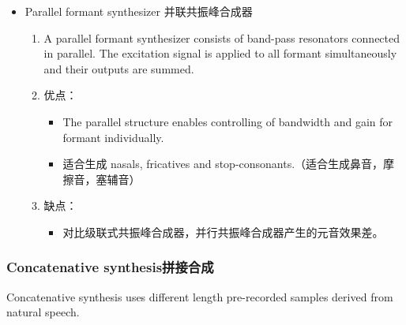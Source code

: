 \documentclass[UTF8]{ctexart}
\begin{document}
\begin{itemize}
    \item Parallel formant synthesizer 并联共振峰合成器
    \begin{enumerate}
        \item A parallel formant synthesizer consists of band-pass resonators connected in parallel. The excitation signal is applied to all formant simultaneously and their outputs are summed.
        \item 优点：
        \begin{itemize}
            \item The parallel structure enables controlling of bandwidth and gain for formant individually.
            \item 适合生成 nasals, fricatives and stop-consonants.（适合生成鼻音，摩擦音，塞辅音）
        \end{itemize}
        \item 缺点：
        \begin{itemize}
            \item 对比级联式共振峰合成器，并行共振峰合成器产生的元音效果差。
        \end{itemize}
    \end{enumerate}
\end{itemize}

\subsubsection{Concatenative synthesis拼接合成}

Concatenative synthesis uses different length pre-recorded samples derived from natural speech.
\end{document}
